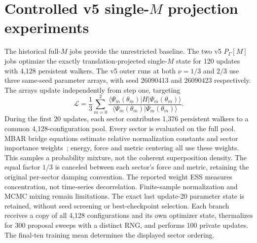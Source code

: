 \section{Controlled v5 single-$M$ projection experiments}

The historical full-$M$ jobs provide the unrestricted baseline. The two v5
$P_\Gamma[M]$ jobs optimize the exactly translation-projected single-$M$
state for 120 updates with 4,128 persistent walkers. The v5 outer runs at
both $\nu=1/3$ and $2/3$ use three same-seed parameter arrays, with seed
26090413 and 26090423 respectively. The arrays update independently from
step one, targeting
\begin{equation}
\mathcal L=\frac13\sum_{m=0}^2
\frac{\langle\Psi_m(\theta_m)|H|\Psi_m(\theta_m)\rangle}
{\langle\Psi_m(\theta_m)|\Psi_m(\theta_m)\rangle}.
\end{equation}
During the first 20 updates, each sector contributes 1,376 persistent walkers
to a common 4,128-configuration pool. Every sector is evaluated on the full
pool. MBAR bridge equations estimate relative normalization constants and
sector importance weights~\cite{mbar}; energy, force and metric centering all
use these weights. This samples a probability mixture, not the coherent
superposition density. The equal factor $1/3$ is canceled between each sector's
force and metric, retaining the original per-sector damping convention.
The reported weight ESS measures concentration, not time-series
decorrelation. Finite-sample normalization and MCMC mixing remain
limitations. The exact last update-20 parameter state is retained,
without seed screening or best-checkpoint selection. Each branch receives a
copy of all 4,128 configurations and its own optimizer state, thermalizes for
300 proposal sweeps with a distinct RNG, and performs 100 private updates.
The final-ten training mean determines the displayed sector ordering.

